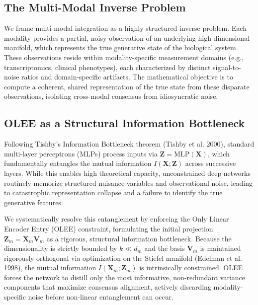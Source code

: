 \documentclass[
  letterpaper,
]{report}
\begin{document}
\subsection{The Multi-Modal Inverse
Problem}\label{the-multi-modal-inverse-problem}

We frame multi-modal integration as a highly structured inverse problem.
Each modality provides a partial, noisy observation of an underlying
high-dimensional manifold, which represents the true generative state of
the biological system. These observations reside within
modality-specific measurement domains (e.g., transcriptomics, clinical
phenotypes), each characterized by distinct signal-to-noise ratios and
domain-specific artifacts. The mathematical objective is to compute a
coherent, shared representation of the true state from these disparate
observations, isolating cross-modal consensus from idiosyncratic noise.

\subsection{OLEE as a Structural Information
Bottleneck}\label{olee-as-a-structural-information-bottleneck}

Following Tishby's Information Bottleneck theorem (Tishby et al. 2000),
standard multi-layer perceptrons (MLPs) process inputs via
\(\mathbf{Z} = \text{MLP}(\mathbf{X})\), which fundamentally entangles
the mutual information \(I(\mathbf{X}; \mathbf{Z})\) across successive
layers. While this enables high theoretical capacity, unconstrained deep
networks routinely memorize structured nuisance variables and
observational noise, leading to catastrophic representation collapse and
a failure to identify the true generative features.

We systematically resolve this entanglement by enforcing the Only Linear
Encoder Entry (OLEE) constraint, formulating the initial projection
\(\mathbf{Z}_m = \mathbf{X}_m \mathbf{V}_m\) as a rigorous, structural
information bottleneck. Because the dimensionality is strictly bounded
by \(k \ll d_m\) and the basis \(\mathbf{V}_m\) is maintained rigorously
orthogonal via optimization on the Stiefel manifold (Edelman et al.
1998), the mutual information \(I(\mathbf{X}_m; \mathbf{Z}_m)\) is
intrinsically constrained. OLEE forces the network to distill only the
most informative, non-redundant variance components that maximize
consensus alignment, actively discarding modality-specific noise before
non-linear entanglement can occur.
\end{document}
